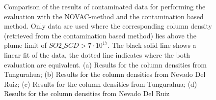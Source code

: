 \documentclass  [
  paper    = a4,
  BCOR     = 10mm,
  twoside,
  fontsize = 12pt,
  fleqn,
  toc      = bibnumbered,
  toc      = listofnumbered,
  numbers  = noendperiod,
  headings = normal,
  listof   = leveldown,
  version  = 3.03
]                                       {scrreprt}
\begin{document}
\begin{figure}[h!]
	\caption{Comparison of the results of contaminated data for performing the evaluation with the NOVAC-method and the contamination based method. Only data are used where the corresponding   column density (retrieved from the contamination based method) lies above the plume limit of $SO2\_SCD>7\cdot 10^{17}$. The black solid line shows a linear fit of the data, the dotted line indicates where the both evaluation are equivalent. (a) Results for the   column densities from Tungurahua; (b) Results for the   column densities from Nevado Del Ruiz; (c) Results for the   column densities from Tungurahua; (d) Results for the   column densities from Nevado Del Ruiz}
	\label{fig:diffNovac}
\end{figure}
\end{document}
